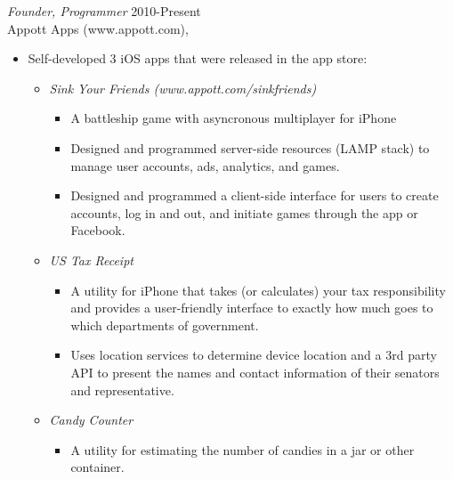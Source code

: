 \documentclass[margin]{res}
\begin{document}
\begin{resume}
                {\sl Founder, Programmer} \hfill            2010-Present \\
                Appott Apps (www.appott.com),
                 \begin{itemize}  \itemsep -2pt %
                 \item Self-developed 3 iOS apps that were released in the app store:
		\begin{itemize} \itemsep -2pt
			\item {\sl Sink Your Friends (www.appott.com/sinkfriends)}
				\begin{itemize} \itemsep -2pt
					\item A battleship game with asyncronous multiplayer for iPhone
					\item Designed and programmed server-side resources (LAMP stack) to manage user accounts, ads, analytics, and games.
					\item Designed and programmed a client-side interface for users to create accounts, log in and out, and initiate games through the app or Facebook.
				\end{itemize}
			\item {\sl US Tax Receipt}
				\begin{itemize} \itemsep -2pt
					\item A utility for iPhone that takes (or calculates) your tax responsibility and provides a user-friendly interface to exactly how much goes to which departments of government.
					\item Uses location services to determine device location and a 3rd party API to present the names and contact information of their senators and representative. 
				\end{itemize}
			\item {\sl Candy Counter}
				\begin{itemize} \itemsep -2pt
					\item A utility for estimating the number of candies in a jar or other container.
				\end{itemize}
		\end{itemize} 
                 \end{itemize} 

\end{resume}
\end{document}
